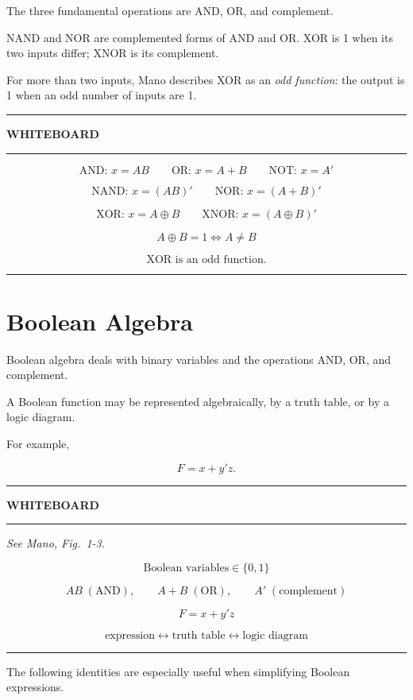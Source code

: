 \documentclass[11pt]{article}
\newenvironment{whiteboard}
{
    \par\medskip
    \hrule
    \vspace{0.35em}
    \noindent\textbf{\large WHITEBOARD}
    \par\vspace{0.3em}
    \hrule
    \vspace{0.65em}
}
{
    \vspace{0.45em}
    \hrule
    \par\medskip
}
\newcommand{\seeMano}[1]{%
    \textit{See Mano, Fig.~#1.}\par\smallskip
}
\begin{document}
The three fundamental operations are AND, OR, and complement.

NAND and NOR are complemented forms of AND and OR. XOR is 1 when its two
inputs differ; XNOR is its complement.

For more than two inputs, Mano describes XOR as an \emph{odd function}: the
output is 1 when an odd number of inputs are 1.

\begin{whiteboard}

\[
\boxed{\text{AND: }x=AB}
\qquad
\boxed{\text{OR: }x=A+B}
\qquad
\boxed{\text{NOT: }x=A'}
\]

\[
\boxed{\text{NAND: }x=(AB)'}
\qquad
\boxed{\text{NOR: }x=(A+B)'}
\]

\[
\boxed{\text{XOR: }x=A\oplus B}
\qquad
\boxed{\text{XNOR: }x=(A\oplus B)'}
\]

\[
A\oplus B=1
\iff
A\neq B
\]

\[
\boxed{\text{XOR is an odd function.}}
\]

\end{whiteboard}

\section{Boolean Algebra}

Boolean algebra deals with binary variables and the operations AND, OR, and
complement.

A Boolean function may be represented algebraically, by a truth table, or by
a logic diagram.

For example,

\[
F=x+y'z.
\]

\begin{whiteboard}

\seeMano{1-3}

\[
\boxed{\text{Boolean variables}\in\{0,1\}}
\]

\[
AB\;(\text{AND}),
\qquad
A+B\;(\text{OR}),
\qquad
A'\;(\text{complement})
\]

\[
F=x+y'z
\]

\[
\boxed{
\text{expression}
\longleftrightarrow
\text{truth table}
\longleftrightarrow
\text{logic diagram}
}
\]

\end{whiteboard}

The following identities are especially useful when simplifying Boolean
expressions.
\end{document}
